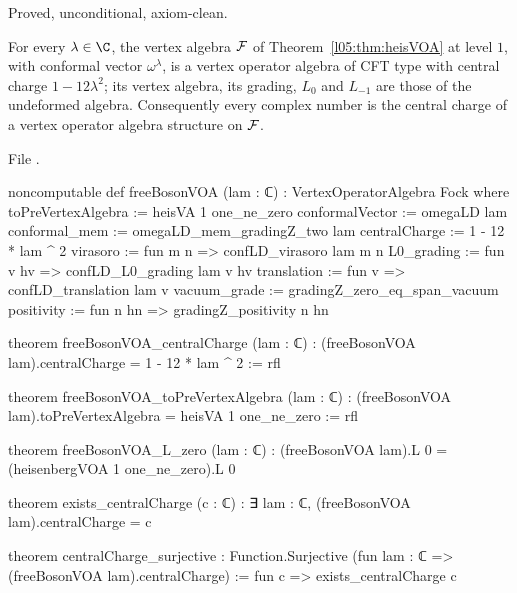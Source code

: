 \begin{status}
Proved, unconditional, axiom-clean.
\end{status}

\begin{theorem}\label{l05:thm:freeboson}
For every $\lambda\in\C$, the vertex algebra $\mathcal{F}$ of Theorem~\ref{l05:thm:heisVOA} at level $1$, with
conformal vector $\omega^\lambda$, is a vertex operator algebra of CFT type with central charge
$1-12\lambda^2$; its vertex algebra, its grading, $L_0$ and $L_{-1}$ are those of the undeformed algebra.
Consequently every complex number is the central charge of a vertex operator algebra structure on $\mathcal{F}$.
\end{theorem}

\noindent File .
\begin{leancode}
noncomputable def freeBosonVOA (lam : ℂ) : VertexOperatorAlgebra Fock where
  toPreVertexAlgebra := heisVA 1 one_ne_zero
  conformalVector := omegaLD lam
  conformal_mem := omegaLD_mem_gradingZ_two lam
  centralCharge := 1 - 12 * lam ^ 2
  virasoro := fun m n => confLD_virasoro lam m n
  L0_grading := fun v hv => confLD_L0_grading lam v hv
  translation := fun v => confLD_translation lam v
  vacuum_grade := gradingZ_zero_eq_span_vacuum
  positivity := fun n hn => gradingZ_positivity n hn

theorem freeBosonVOA_centralCharge (lam : ℂ) :
    (freeBosonVOA lam).centralCharge = 1 - 12 * lam ^ 2 := rfl

theorem freeBosonVOA_toPreVertexAlgebra (lam : ℂ) :
    (freeBosonVOA lam).toPreVertexAlgebra = heisVA 1 one_ne_zero := rfl

theorem freeBosonVOA_L_zero (lam : ℂ) :
    (freeBosonVOA lam).L 0 = (heisenbergVOA 1 one_ne_zero).L 0

theorem exists_centralCharge (c : ℂ) :
    ∃ lam : ℂ, (freeBosonVOA lam).centralCharge = c

theorem centralCharge_surjective :
    Function.Surjective (fun lam : ℂ => (freeBosonVOA lam).centralCharge) :=
  fun c => exists_centralCharge c
\end{leancode}

